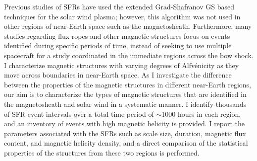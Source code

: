 Previous studies of SFRs have used the extended Grad-Shafranov GS based techniques for the solar wind plasma; however, this algorithm was not used in other regions of near-Earth space such as the magnetosheath. Furthermore, many studies regarding flux ropes and other magnetic structures focus on events identified during specific periods of time, instead of seeking to use multiple spacecraft for a study coordinated in the immediate regions across the bow shock. I characterize magnetic structures with varying degrees of Alfv\'enicity as they move across boundaries in near-Earth space. As I investigate the difference between the properties of the magnetic structures in different near-Earth regions, our aim is to characterize the types of magnetic structures that are identified in the magnetosheath and solar wind in a systematic manner. I identify thousands of SFR event intervals over a total time period of $\sim$1000 hours in each region, and an inventory of events with high magnetic helicity is provided. I report the parameters associated with the SFRs such as scale size, duration, magnetic flux content, and magnetic helicity density, and a direct comparison of the statistical properties of the structures from these two regions is performed.

\clearpage


